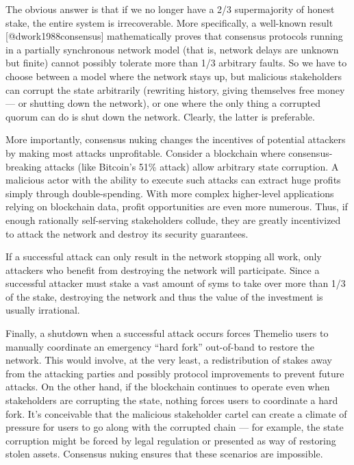\documentclass[]{article}
\begin{document}
The obvious answer is that if we no longer have a 2/3 supermajority of
honest stake, the entire system is irrecoverable. More specifically, a
well-known result {[}@dwork1988consensus{]} mathematically proves that
consensus protocols running in a partially synchronous network model
(that is, network delays are unknown but finite) cannot possibly
tolerate more than 1/3 arbitrary faults. So we have to choose between a
model where the network stays up, but malicious stakeholders can corrupt
the state arbitrarily (rewriting history, giving themselves free money
--- or shutting down the network), or one where the only thing a
corrupted quorum can do is shut down the network. Clearly, the latter is
preferable.

More importantly, consensus nuking changes the incentives of potential
attackers by making most attacks unprofitable. Consider a blockchain
where consensus-breaking attacks (like Bitcoin's 51\% attack) allow
arbitrary state corruption. A malicious actor with the ability to
execute such attacks can extract huge profits simply through
double-spending. With more complex higher-level applications relying on
blockchain data, profit opportunities are even more numerous. Thus, if
enough rationally self-serving stakeholders collude, they are greatly
incentivized to attack the network and destroy its security guarantees.

If a successful attack can only result in the network stopping all work,
only attackers who benefit from destroying the network will participate.
Since a successful attacker must stake a vast amount of syms to take
over more than 1/3 of the stake, destroying the network and thus the
value of the investment is usually irrational.

Finally, a shutdown when a successful attack occurs forces Themelio
users to manually coordinate an emergency ``hard fork'' out-of-band to
restore the network. This would involve, at the very least, a
redistribution of stakes away from the attacking parties and possibly
protocol improvements to prevent future attacks. On the other hand, if
the blockchain continues to operate even when stakeholders are
corrupting the state, nothing forces users to coordinate a hard fork.
It's conceivable that the malicious stakeholder cartel can create a
climate of pressure for users to go along with the corrupted chain ---
for example, the state corruption might be forced by legal regulation or
presented as way of restoring stolen assets. Consensus nuking ensures
that these scenarios are impossible.
\end{document}
